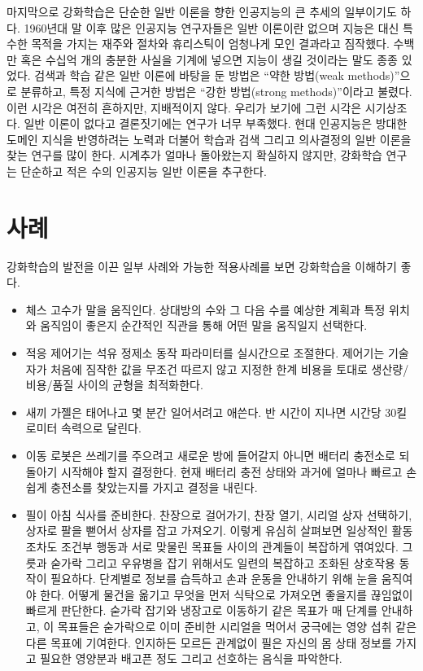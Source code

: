 마지막으로 강화학습은 단순한 일반 이론을 향한 인공지능의 큰 추세의 일부이기도
하다. 1960년대 말 이후 많은 인공지능 연구자들은 일반 이론이란 없으며 지능은 대신
특수한 목적을 가지는 재주와 절차와 휴리스틱이 엄청나게 모인 결과라고 짐작했다.
수백만 혹은 수십억 개의 충분한 사실을 기계에 넣으면 지능이 생길 것이라는 말도
종종 있었다. 검색과 학습 같은 일반 이론에 바탕을 둔 방법은 ``약한 방법(weak
methods)''으로 분류하고, 특정 지식에 근거한 방법은 ``강한 방법(strong
methods)''이라고 불렸다. 이런 시각은 여전히 흔하지만, 지배적이지 않다. 우리가
보기에 그런 시각은 시기상조다. 일반 이론이 없다고 결론짓기에는 연구가 너무
부족했다. 현대 인공지능은 방대한 도메인 지식을 반영하려는 노력과 더불어 학습과
검색 그리고 의사결정의 일반 이론을 찾는 연구를 많이 한다. 시계추가 얼마나
돌아왔는지 확실하지 않지만, 강화학습 연구는 단순하고 적은 수의 인공지능 일반
이론을 추구한다.


\section{사례}

강화학습의 발전을 이끈 일부 사례와 가능한 적용사례를 보면 강화학습을 이해하기
좋다.

\begin{itemize}
\item 체스 고수가 말을 움직인다. 상대방의 수와 그 다음 수를 예상한 계획과
      특정 위치와 움직임이 좋은지 순간적인 직관을 통해 어떤 말을 움직일지
      선택한다.
\item 적응 제어기는 석유 정제소 동작 파라미터를 실시간으로 조절한다. 제어기는
      기술자가 처음에 짐작한 값을 무조건 따르지 않고 지정한 한계 비용을 토대로
      생산량/비용/품질 사이의 균형을 최적화한다.
\item 새끼 가젤은 태어나고 몇 분간 일어서려고 애쓴다. 반 시간이 지나면 시간당
      30킬로미터 속력으로 달린다.
\item 이동 로봇은 쓰레기를 주으려고 새로운 방에 들어갈지 아니면 배터리 충전소로
      되돌아기 시작해야 할지 결정한다. 현재 배터리 충전 상태와 과거에 얼마나
      빠르고 손쉽게 충전소를 찾았는지를 가지고 결정을 내린다.
\item 필이 아침 식사를 준비한다. 찬장으로 걸어가기, 찬장 열기, 시리얼 상자
      선택하기, 상자로 팔을 뻗어서 상자를 잡고 가져오기. 이렇게 유심히 살펴보면
      일상적인 활동조차도 조건부 행동과 서로 맞물린 목표들 사이의 관계들이
      복잡하게 엮여있다. 그릇과 숟가락 그리고 우유병을 잡기 위해서도 일련의
      복잡하고 조화된 상호작용 동작이 필요하다. 단계별로 정보를 습득하고 손과
      운동을 안내하기 위해 눈을 움직여야 한다. 어떻게 물건을 옮기고 무엇을 먼저
      식탁으로 가져오면 좋을지를 끊임없이 빠르게 판단한다. 숟가락 잡기와
      냉장고로 이동하기 같은 목표가 매 단계를 안내하고, 이 목표들은 숟가락으로
      이미 준비한 시리얼을 먹어서 궁극에는 영양 섭취 같은 다른 목표에 기여한다.
      인지하든 모르든 관계없이 필은 자신의 몸 상태 정보를 가지고 필요한 영양분과
      배고픈 정도 그리고 선호하는 음식을 파악한다.
\end{itemize}

